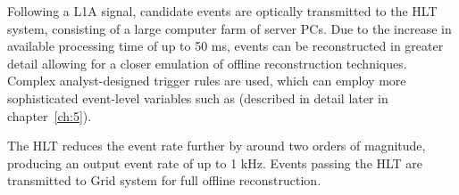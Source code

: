 Following a L1A signal, candidate events are optically transmitted to the HLT 
system, consisting of a large computer farm of server 
PCs. Due to the increase in available processing time of up to 50 ms, events can
be reconstructed in greater detail allowing for a closer emulation of offline 
reconstruction techniques. Complex analyst-designed trigger rules are used, 
which can employ more sophisticated event-level variables such as \alphat
(described in detail later in chapter~\ref{ch:5}).

The HLT reduces the event rate further by around two orders of magnitude,
producing an output event rate of up to 1 kHz. Events passing the HLT are
transmitted to Grid system \cite{Eck:840543} for full offline reconstruction.
